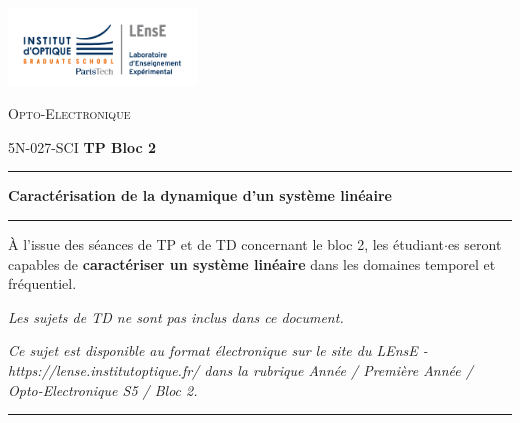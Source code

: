 \documentclass[a4paper,11pt]{article} %
\begin{document}
\begin{minipage}[c]{.25\linewidth}
	\includegraphics[width=5cm]{images/Logo-LEnsE.png}
\end{minipage} \hfill
\begin{minipage}[c]{.4\linewidth}

\begin{center}
\vspace{0.3cm}
{\Large \textsc{Opto-Electronique}}

\medskip

5N-027-SCI \qquad \textbf{\Large TP Bloc 2}

\end{center}
\end{minipage}\hfill

\vspace{0.5cm}

\noindent \rule{\linewidth}{1pt}

{\noindent\Large \rule[-7pt]{0pt}{30pt}  \textbf{Caractérisation %
de la dynamique %
d'un système linéaire}}

\noindent \rule{\linewidth}{1pt}

{\large À l'issue des séances de TP et de TD concernant le bloc 2, les étudiant$\cdot$es seront capables de \textbf{caractériser un système linéaire} dans les domaines temporel et fréquentiel.}

\medskip

\textit{Les sujets de TD ne sont pas inclus dans ce document.}

\medskip

\textit{Ce sujet est disponible au format électronique sur le site du LEnsE - https://lense.institutoptique.fr/ dans la rubrique Année / Première Année / Opto-Electronique S5 / Bloc 2.}

\noindent \rule{\linewidth}{1pt}

\medskip
\end{document}
